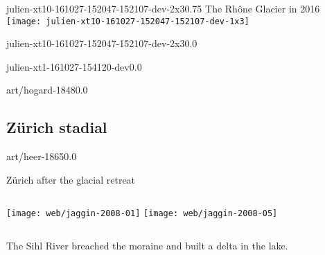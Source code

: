 \begin{CJK}{UTF8}{min}
    \begin{backgroundframe}{julien-xt10-161027-152047-152107-dev-2x3}{0.75}
                           {The Rhône Glacier in 2016}
      \vspace{12mm}
      \texttt{[image: julien-xt10-161027-152047-152107-dev-1x3]}
    \end{backgroundframe}

    \begin{backgroundframe}[b]{julien-xt10-161027-152047-152107-dev-2x3}{0.0}{}
      \flushleft{}
    \end{backgroundframe}

    \begin{backgroundframe}[b]{julien-xt1-161027-154120-dev}{0.0}{}
      \flushleft{}
    \end{backgroundframe}

    \begin{backgroundframe}[b]{art/hogard-1848}{0.0}{}
      \flushleft{}
    \end{backgroundframe}


\subsection{Zürich stadial}

    \begin{backgroundframe}[t]{art/heer-1865}{0.0}{}
      \flushleft{}
    \end{backgroundframe}

    \begin{frame}{Zürich after the glacial retreat}
      \begin{columns}
        \column{60mm}
          \texttt{[image: web/jaggin-2008-01]}  %
        \column{60mm}
          \texttt{[image: web/jaggin-2008-05]}  %
      \end{columns}
      \bigskip
      The Sihl River breached the moraine and built a delta in the lake.
    \end{frame}



\end{CJK}
